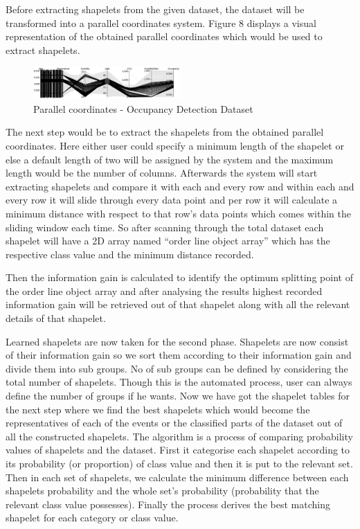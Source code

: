 \documentclass[conference]{IEEEtran}  %
\begin{document}
Before extracting shapelets from the given dataset, the dataset will be transformed into a parallel coordinates system. Figure 8 displays a visual representation of the obtained parallel coordinates which would be used to extract shapelets.

\begin{figure}[h!]
\includegraphics[width=0.5\textwidth]{occupancy_d3.png}
\caption{Parallel coordinates - Occupancy Detection Dataset}
\end{figure}

The next step would be to extract the shapelets from the obtained parallel coordinates. Here either user could specify a minimum length of the shapelet or else a default length of two will be assigned by the system and the maximum length would be the number of columns. Afterwards the system will start extracting shapelets and compare it with each and every row and within each and every row it will slide through every data point and per row it will calculate a minimum distance with respect to that row’s data points which comes within the sliding window each time. So after scanning through the total dataset each shapelet will have a 2D array named “order line object array” which has the respective class value and the minimum distance recorded.

Then the information gain is calculated to identify the optimum splitting point of the order line object array and after analysing the results highest recorded information gain will be retrieved out of that shapelet along with all the relevant details of that shapelet. 

Learned shapelets are now taken for the second phase. Shapelets are now consist of their information gain so we sort them according to their information gain and divide them into sub groups. No of sub groups can be defined by considering the total number of shapelets. Though this is the automated process, user can always define the number of groups if he wants. Now we have got the shapelet tables for the next step where we find the best shapelets which would become the representatives of each of the events or the classified parts of the dataset out of all the constructed shapelets. The algorithm is a process of comparing probability values of shapelets and the dataset. First it categorise each shapelet according to its probability (or proportion) of class value and then it is put to the relevant set. Then in each set of shapelets, we calculate the minimum difference between each shapelets probability and the whole set’s probability (probability that the relevant class value possesses). Finally the process derives the best matching shapelet for each category or class value.
\end{document}
